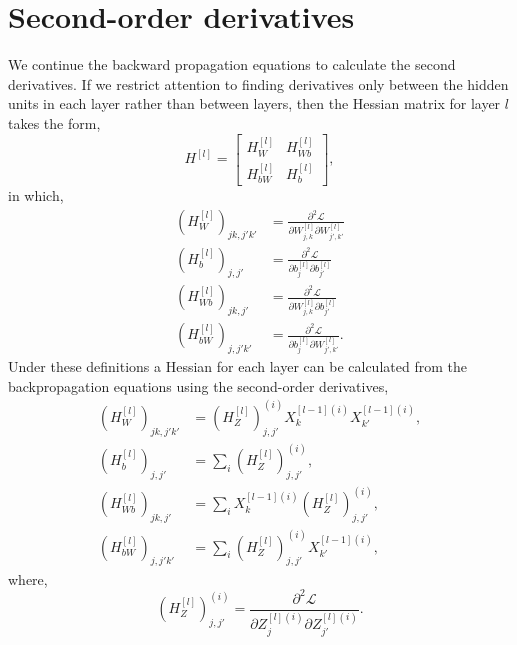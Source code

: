 \documentclass[nohyperref]{article}
\theoremstyle{plain}
\theoremstyle{definition}
\theoremstyle{remark}
\begin{document}
\section{Second-order derivatives}\label{Hess_prop}
We continue the backward propagation equations to calculate the second derivatives. If we restrict attention to finding derivatives only between the hidden units in each layer rather than between layers, then the Hessian matrix for layer $l$ takes the form,
\begin{equation}
H^{[l]}=\left[
\begin{array}{cc}
H_W^{[l]} & H_{Wb}^{[l]} \\
H_{bW}^{[l]} & H_{b}^{[l]}
\end{array}
\right],
\end{equation}
in which,
\begin{align}
(H_W^{[l]})_{jk,j'k'}&=\frac{\partial^2 \mathcal{L}}{\partial W^{[l]}_{j,k} \partial W^{[l]}_{j',k'}}\label{H_W}\\
(H_b^{[l]})_{j,j'}&=\frac{\partial^2 \mathcal{L}}{\partial b_{j}^{[l]} \partial b_{j'}^{[l]}}\\
(H_{Wb}^{[l]})_{jk,j'}&=\frac{\partial^2 \mathcal{L}}{\partial W^{[l]}_{j,k} \partial b^{[l]}_{j'}}\\
(H_{bW}^{[l]})_{j,j'k'}&=\frac{\partial^2 \mathcal{L}}{\partial b^{[l]}_{j} \partial W^{[l]}_{j',k'} }.
\end{align}
Under these definitions a Hessian for each layer can be calculated from the backpropagation equations using the second-order derivatives,
\begin{align}
(H_W^{[l]})_{jk,j'k'}&=(H_Z^{[l]})^{(i)}_{j,j'}X_{k}^{[l-1](i)}X_{k'}^{[l-1](i)},\label{d2L_dW2}\\
(H_b^{[l]})_{j,j'}&=\sum_{i}(H_Z^{[l]})^{(i)}_{j,j'},\label{d2L_db2}\\
(H_{Wb}^{[l]})_{jk,j'}&=\sum_{i} X_{k}^{[l-1](i)}(H_Z^{[l]})^{(i)}_{j,j'},\\
(H_{bW}^{[l]})_{j,j'k'}&=\sum_{i} (H_Z^{[l]})^{(i)}_{j,j'}X_{k'}^{[l-1](i)},%
\end{align}
where,
\begin{equation}
(H_Z^{[l]})^{(i)}_{j,j'}=\frac{\partial^2 \mathcal{L}}{\partial Z_{j}^{[l](i)} \partial Z_{j'}^{[l](i)}}\label{H_Z_ijj}.
\end{equation}
\end{document}
